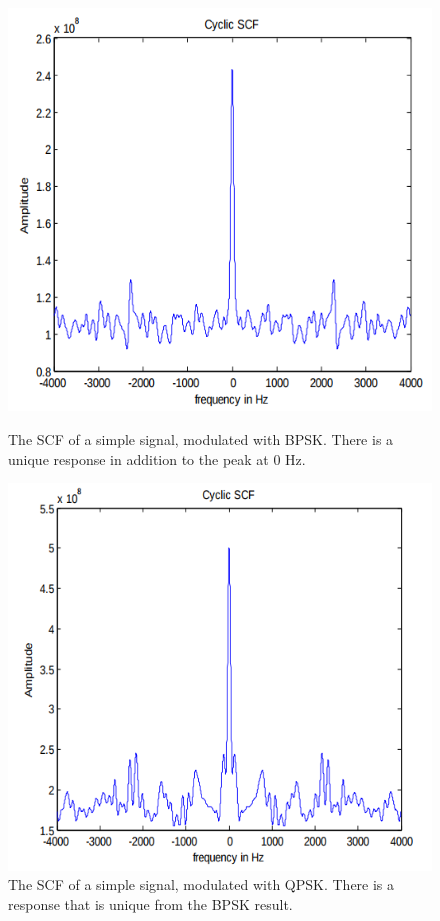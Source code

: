 \begin{figure}[ht!]
\begin{minipage}{.4\textwidth}
  \centering
\includegraphics[scale=0.3]{img/cyclic_scf_bpsk.png}
\caption{The SCF of a simple signal, modulated with BPSK. There is a unique response in addition to the peak at 0 Hz. }
\label{fig:cyclic_scf_bpsk}
\end{minipage}
\begin{minipage}{0.4\textwidth}
\centering
\includegraphics[scale=0.3]{img/cyclic_scf_qpsk.png}
\caption{The SCF of a simple signal, modulated with QPSK. There is a response that is unique from the BPSK result.}
\label{fig:cyclic_scf_qpsk}
\end{minipage}
\end{figure}

